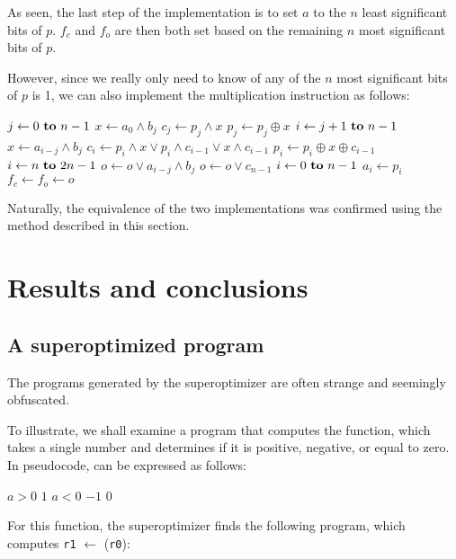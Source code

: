 \documentclass[a4paper,11pt]{kth-mag}
\renewcommand{\gets}{\leftarrow}
\newcommand{\AND}{\land}
\newcommand{\IOR}{\lor}
\newcommand{\XOR}{\oplus}
\begin{document}
As seen, the last step of the implementation is to set $a$ to the $n$ least significant bits of $p$.
$f_c$ and $f_o$ are then both set based on the remaining $n$ most significant bits of $p$.

However, since we really only need to know of any of the $n$ most significant bits of $p$ is 1, we can also implement the multiplication instruction as follows:

\begin{codebox}
\zi \For $j \gets 0 \To n-1$ \Do
\zi   $x \gets a_{0} \AND b_{j}$
\zi   $c_{j} \gets p_{j} \AND x$
\zi   $p_{j} \gets p_{j} \XOR x$
\zi   \For $i \gets j+1 \To n-1$ \Do
\zi     $x \gets a_{i-j} \AND b_{j}$
\zi     $c_{i} \gets p_{i} \AND x \IOR p_{i} \AND c_{i-1} \IOR x \AND c_{i-1}$
\zi     $p_{i} \gets p_{i} \XOR x \XOR c_{i-1}$ \End
\zi   \For $i \gets n \To 2n-1$ \Do
\zi     $o \gets o \IOR a_{i-j} \AND b_{j}$ \End
\zi   $o \gets o \IOR c_{n-1}$ \End
\zi \For $i \gets 0 \To n-1$ \Do
\zi   $a_{i} \gets p_{i}$ \End
\zi $f_c \gets f_o \gets o$
\end{codebox}

Naturally, the equivalence of the two implementations was confirmed using the method described in this section.

\chapter{Results and conclusions}
\label{ch:results_conclusions}

\section{A superoptimized program}

The programs generated by the superoptimizer are often strange and seemingly obfuscated.

To illustrate, we shall examine a program that computes the  function, which takes a single number and determines if it is positive, negative, or equal to zero. %
In pseudocode,  can be expressed as follows:

\begin{codebox}
\zi \If $a > 0$
\zi \Do
      \Return $1$
    \End
\zi \If $a < 0$
\zi \Do
      \Return $-1$
    \End
\zi \Return $0$
\end{codebox}

For this function, the superoptimizer finds the following program, which computes \verb|r1| $\gets$ (\verb|r0|):
\end{document}
